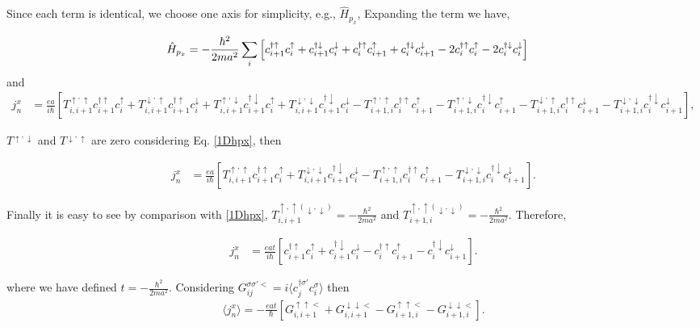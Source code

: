 \documentclass[10pt,prb,showpacs,amssymb,floatfix]{revtex4-1}
\newcommand{\dg}{\dagger}
\newcommand{\dna}{\downarrow}
\newcommand{\dn}{\downarrow}
\newcommand{\upa}{\uparrow}
\newcommand{\sg}{\sigma}
\newcommand{\h}{\hat}
\begin{document}
Since each term is identical, we choose one axis for simplicity, e.g., $\h H_{p_x}$, Expanding the term we have,

\begin{align}
\h H_{p_x} &=  -\frac{\hbar^2}{2ma^2} \sum_{i}  \Big{[} c_{i+1}^{\dagger \upa} c_{i}^\upa + c_{i+1}^{\dagger \dn} c_{i}^\dn  +c_{i}^{\dagger \upa} c_{i+1}^\upa + c_{i}^{\dagger \dn} c_{i+1}^\dn  - 2 c_{i}^{\dagger \upa} c_{i}^\upa   - 2 c_{i}^{\dagger \dn} c_{i}^\dn  \Big{]}
\label{1Dhpx}
\end{align}
and
\begin{align}
j^x_n&=\frac{ea}{i\hbar} [T^{\upa,\upa}_{i,i+1} c^{\dagger\upa}_{i+1} c^{\upa}_i+T^{\dna,\upa}_{i,i+1} c^{\dagger\upa}_{i+1} c^{\dna}_i + T^{\upa,\dna}_{i,i+1} c^{\dagger\dna}_{i+1} c^{\upa}_i+T^{\dna,\dna}_{i,i+1} c^{\dagger\dna}_{i+1} c^{\dna}_i   - T^{\upa,\upa}_{i+1,i} c^{\dagger\upa}_{i} c^{\upa}_{i+1} - T^{\upa,\dn}_{i+1,i} c^{\dagger\dn}_{i} c^{\upa}_{i+1} -  T^{\dn,\upa}_{i+1,i} c^{\dagger\upa}_{i} c^{\dn}_{i+1} - T^{\dna,\dna}_{i+1,i} c^{\dagger\dna}_{i} c^{\dna}_{i+1} ], 
\end{align}

$T^{\upa,\dn}$ and $T^{\dn,\upa}$ are zero  considering Eq. \eqref{1Dhpx}, then

\begin{align}
j_n^x &=\frac{ea}{i\hbar} [T^{\upa,\upa}_{i,i+1} c^{\dagger\upa}_{i+1} c^{\upa}_i +T^{\dna,\dna}_{i,i+1} c^{\dagger\dna}_{i+1} c^{\dna}_i   - T^{\upa,\upa}_{i+1,i} c^{\dagger\upa}_{i} c^{\upa}_{i+1}  - T^{\dna,\dna}_{i+1,i} c^{\dagger\dna}_{i} c^{\dna}_{i+1} ].
\end{align}

Finally it is easy to see by comparison with \eqref{1Dhpx}, $T^{\upa, \upa (\dna,\dna)}_{i,i+1} = -\frac{\hbar^2}{2ma^2}$ and $T^{\upa, \upa (\dna,\dna)}_{i+1,i} = -\frac{\hbar^2}{2ma^2}$. Therefore,


\begin{align}
j_n^x &=\frac{eat}{i\hbar} [c^{\dagger\upa}_{i+1} c^{\upa}_i + c^{\dagger\dna}_{i+1} c^{\dna}_i   - c^{\dagger\upa}_{i} c^{\upa}_{i+1}  -  c^{\dagger\dna}_{i} c^{\dna}_{i+1} ].
\end{align}

where we have defined $t=-\frac{\hbar^2}{2ma^2}$. Considering $G_{ij}^{\sg\sg' <} = i \langle c_j^{\dg \sg'} c_i^\sg \rangle$ then
\begin{align}
\langle j_n^x \rangle = -\frac{eat}{\hbar}[ G_{i,i+1}^{\upa\upa <}+ G_{i,i+1}^{\dna\dna <} - G_{i+1,i}^{\upa\upa <}  - G_{i+1,i}^{\dna\dna <}].
\end{align}
\end{document}
